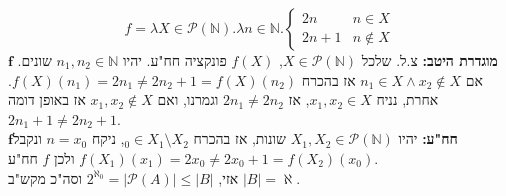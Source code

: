 \documentclass[]{article}
\newcommand\N     {\mathbb{N}}
\newcommand\ps    {\mathcal{P}}
\newcommand\taz   {2^{\aleph_0}}
\newcommand\al    {\aleph}
\begin{document}
\begin{enumerate}
		\[ f = \lambda X \in \ps(\N). \lambda n \in \N. \begin{cases}
			2n & n \in X \\
			2n + 1 &n \not\in X
		\end{cases} \]
	$ \bm{f} $ \textbf{מוגדרת היטב: }צ.ל. שלכל $ X \in \ps(\N) $, $ f(X) $ פונקציה חח"ע. יהיו $ n_1, n_2 \in \N $ שונים. אם $ n_1 \in X \land x_2 \not\in X $ אז בהכרח $ f(X)(n_1) = 2n_1 \neq 2n_2 + 1 = f(X)(n_2) $. אחרת, נניח $ x_1, x_2 \in X $, אז $ 2n_1 \neq 2n_2 $ וגמרנו, ואם $ x_1, x_2 \not\in X $ אז באופן דומה $ 2n_1 + 1 \neq 2n_2 + 1 $. \\
	$ \bm{f} $\textbf{חח"ע: }יהיו $ X_1, X_2 \in \ps(\N) $ שונות, אז בהכרח $ _0 \in X_1 \setminus X_2 $, ניקח $ n = x_0 $ ונקבל $ f(X_1)(x_1) = 2x_0 \neq 2x_0 + 1 = f(X_2)(x_0) $ ולכן $ f $ חח"ע. \\
	אזי, $ \taz = |\ps(A)| \le |B| $ וסה"כ מקש"ב $ |B| = \al $. 
	\end{enumerate}
	
\end{document}
